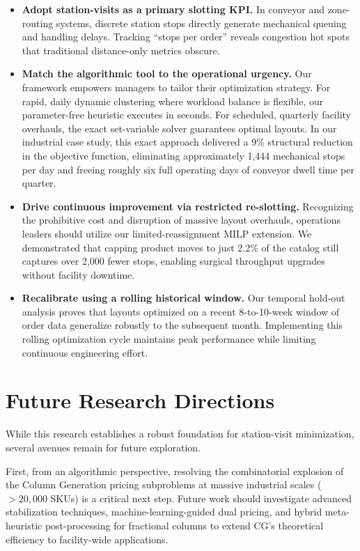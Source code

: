 \documentclass[preprint,review,11pt,authoryear]{elsarticle}
\begin{document}
\begin{itemize}
    \item \textbf{Adopt station-visits as a primary slotting KPI.} In conveyor and zone-routing systems, discrete station stops directly generate mechanical queuing and handling delays. Tracking ``stops per order'' reveals congestion hot spots that traditional distance-only metrics obscure.
    \item \textbf{Match the algorithmic tool to the operational urgency.} Our framework empowers managers to tailor their optimization strategy. For rapid, daily dynamic clustering where workload balance is flexible, our parameter-free heuristic executes in seconds. For scheduled, quarterly facility overhauls, the exact set-variable solver guarantees optimal layouts. In our industrial case study, this exact approach delivered a 9\% structural reduction in the objective function, eliminating approximately 1,444 mechanical stops per day and freeing roughly six full operating days of conveyor dwell time per quarter.
    \item \textbf{Drive continuous improvement via restricted re-slotting.} Recognizing the prohibitive cost and disruption of massive layout overhauls, operations leaders should utilize our limited-reassignment MILP extension. We demonstrated that capping product moves to just 2.2\% of the catalog still captures over 2,000 fewer stops, enabling surgical throughput upgrades without facility downtime.
    \item \textbf{Recalibrate using a rolling historical window.} Our temporal hold-out analysis proves that layouts optimized on a recent 8-to-10-week window of order data generalize robustly to the subsequent month. Implementing this rolling optimization cycle maintains peak performance while limiting continuous engineering effort.
\end{itemize}




\section {Future Research Directions}
While this research establishes a robust foundation for station-visit minimization, several avenues remain for future exploration. 

First, from an algorithmic perspective, resolving the combinatorial explosion of the Column Generation pricing subproblems at massive industrial scales ($>20,000$ SKUs) is a critical next step. Future work should investigate advanced stabilization techniques, machine-learning-guided dual pricing, and hybrid meta-heuristic post-processing for fractional columns to extend CG's theoretical efficiency to facility-wide applications.
\end{document}
